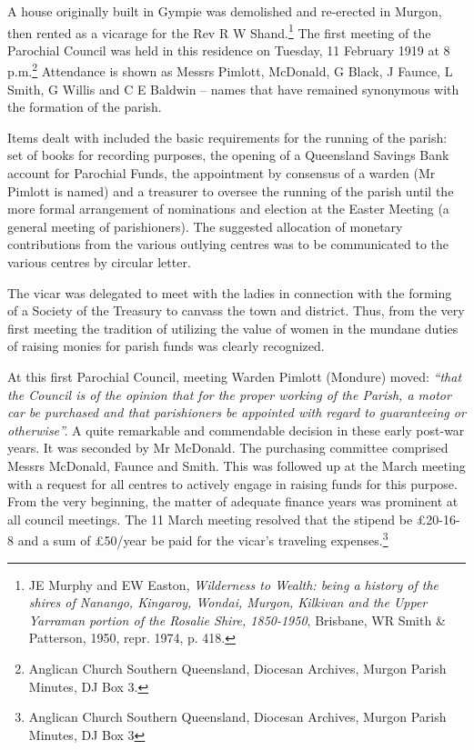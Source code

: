 A house originally built in Gympie was demolished and re-erected in Murgon, then rented as a vicarage for the Rev R W Shand.\footnote{JE Murphy and EW Easton, \emph{Wilderness to Wealth: being a history of the shires of Nanango, Kingaroy, Wondai, Murgon, Kilkivan and the Upper Yarraman portion of the Rosalie Shire, 1850-1950}, Brisbane, WR Smith \& Patterson, 1950, repr. 1974, p. 418.} The first meeting of the Parochial Council was held in this residence on Tuesday, 11 February 1919 at 8 p.m.\footnote{Anglican Church Southern Queensland, Diocesan Archives, Murgon Parish Minutes, DJ Box 3.} Attendance is shown as Messrs Pimlott, McDonald, G Black, J Faunce, L Smith, G Willis and C E Baldwin -- names that have remained synonymous with the formation of the parish.

Items dealt with included the basic requirements for the running of the parish: set of books for recording purposes, the opening of a Queensland Savings Bank account for Parochial Funds, the appointment by consensus of a warden (Mr Pimlott is named) and a treasurer to oversee the running of the parish until the more formal arrangement of nominations and election at the Easter Meeting (a general meeting of parishioners). The suggested allocation of monetary contributions from the various outlying centres was to be communicated to the various centres by circular letter.

The vicar was delegated to meet with the ladies in connection with the forming of a Society of the Treasury to canvass the town and district. Thus, from the very first meeting the tradition of utilizing the value of women in the mundane duties of raising monies for parish funds was clearly recognized.

At this first Parochial Council, meeting Warden Pimlott (Mondure) moved: \emph{``that the Council is of the opinion that for the proper working of the Parish, a motor car be purchased and that parishioners be appointed with regard to guaranteeing or otherwise''.} A quite remarkable and commendable decision in these early post-war years. It was seconded by Mr McDonald. The purchasing committee comprised Messrs McDonald, Faunce and Smith. This was followed up at the March meeting with a request for all centres to actively engage in raising funds for this purpose. From the very beginning, the matter of adequate finance years was prominent at all council meetings. The 11 March meeting resolved that the stipend be £20-16-8 and a sum of £50/year be paid for the vicar's traveling expenses.\footnote{Anglican Church Southern Queensland, Diocesan Archives, Murgon Parish Minutes, DJ Box 3}

